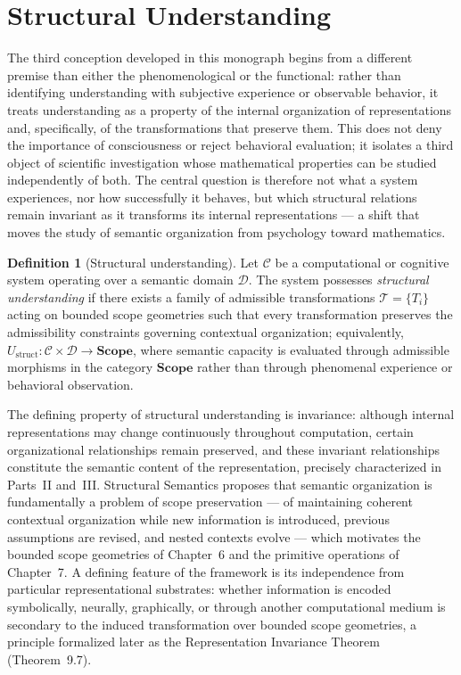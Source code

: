 \documentclass[11pt,twoside,openright]{book}
\numberwithin{equation}{chapter}
\theoremstyle{definition}
\newtheorem{definition}{Definition}[chapter]
\theoremstyle{plain}
\theoremstyle{remark}
\theoremstyle{definition}
\newcommand{\CatScope}{\mathbf{Scope}}
\newcommand{\Domain}{\mathcal{D}}
\newcommand{\System}{\mathcal{C}}
\newcommand{\Trans}{\mathcal{T}}
\begin{document}
\section{Structural Understanding}

The third conception developed in this monograph begins from a different
premise than either the phenomenological or the functional: rather than
identifying understanding with subjective experience or observable
behavior, it treats understanding as a property of the internal
organization of representations and, specifically, of the transformations
that preserve them. This does not deny the importance of consciousness or
reject behavioral evaluation; it isolates a third object of scientific
investigation whose mathematical properties can be studied independently
of both. The central question is therefore not what a system experiences,
nor how successfully it behaves, but which structural relations remain
invariant as it transforms its internal representations --- a shift that
moves the study of semantic organization from psychology toward
mathematics.

\begin{definition}[Structural understanding]
Let $\System$ be a computational or cognitive system operating over a
semantic domain $\Domain$. The system possesses \emph{structural
understanding} if there exists a family of admissible transformations
$\Trans=\{T_i\}$ acting on bounded scope geometries such that every
transformation preserves the admissibility constraints governing
contextual organization; equivalently,
$U_{\mathrm{struct}}:\System\times\Domain\to\CatScope$, where semantic
capacity is evaluated through admissible morphisms in the category
$\CatScope$ rather than through phenomenal experience or behavioral
observation.
\end{definition}

The defining property of structural understanding is invariance: although
internal representations may change continuously throughout computation,
certain organizational relationships remain preserved, and these
invariant relationships constitute the semantic content of the
representation, precisely characterized in Parts~II and~III. Structural
Semantics proposes that semantic organization is fundamentally a problem
of scope preservation --- of maintaining coherent contextual organization
while new information is introduced, previous assumptions are revised,
and nested contexts evolve --- which motivates the bounded scope
geometries of Chapter~6 and the primitive operations of Chapter~7. A
defining feature of the framework is its independence from particular
representational substrates: whether information is encoded symbolically,
neurally, graphically, or through another computational medium is
secondary to the induced transformation over bounded scope geometries, a
principle formalized later as the Representation Invariance Theorem
(Theorem~9.7).
\end{document}
